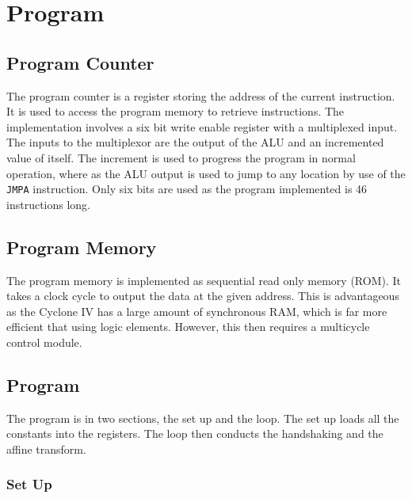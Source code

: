 
\section{Program}\label{sect:prog}

\subsection{Program Counter}
The program counter is a register storing the address of the current instruction.
It is used to access the program memory to retrieve instructions. 
The implementation involves a six bit write enable register with a multiplexed input. 
The inputs to the multiplexor are the output of the ALU and an incremented value of itself.
The increment is used to progress the program in normal operation, where as the ALU output is used to jump to any location by use of the \texttt{JMPA} instruction.
Only six bits are used as the program implemented is 46 instructions long. 

\subsection{Program Memory}
The program memory is implemented as sequential read only memory (ROM). 
It takes a clock cycle to output the data at the given address. 
This is advantageous as the Cyclone IV has a large amount of synchronous RAM, which is far more efficient that using logic elements.
However, this then requires a multicycle control module. 

\subsection{Program}

The program is in two sections, the set up and the loop. 
The set up loads all the constants into the registers. 
The loop then conducts the handshaking and the affine transform. 

\subsubsection{Set Up}

